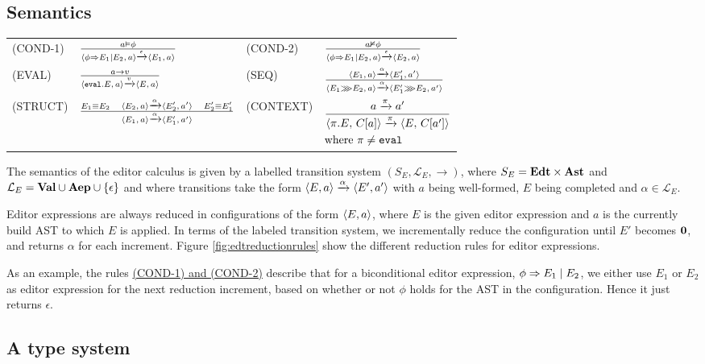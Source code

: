\subsection{Semantics}

\begin{figure*}
  \center
  \renewcommand{\arraystretch}{2}
  \begin{tabular}{llll}
    \scriptsize(COND-1)  & $ \CondOne $           & \scriptsize(COND-2) & $ \CondTwo$ \\
    \scriptsize(EVAL)    & $ \Eval $              & \scriptsize(SEQ)    & $ \Seq$     \\
    \scriptsize(STRUCT)  & $\Struct$              & \scriptsize(CONTEXT)& \scriptsize$\Context$
  \end{tabular}
  \caption{Editor Expression reduction rules}
  \label{fig:edtreductionrules}
\end{figure*}

The semantics of the editor calculus is given by a labelled transition system
$(S_E, \mathcal{L}_E, \to)$, where $S_E = \edt \times \AST$ and $\mathcal{L}_E
= \val \cup \aep \cup \{\epsilon\}$ and where transitions take the form
$\breakpoint{E, a} \transition{$\alpha$} \breakpoint{E', a'}$ with $a$ being
well-formed, $E$ being completed and $\alpha \in \mathcal{L}_E$. 

Editor expressions are always reduced in configurations of the form
$\breakpoint{E,a}$, where $E$ is the given editor expression and $a$ is the
currently build AST to which $E$ is applied. In terms of the labeled
transition system, we incrementally reduce the configuration until $E'$ becomes
$\nil$, and returns $\alpha$ for each increment. Figure
\ref{fig:edtreductionrules} show the different reduction rules for editor
expressions.

As an example, the rules \hyperref[fig:edtreductionrules]{(COND-1) and (COND-2)} describe that
for a biconditional editor expression, $\bicond{\phi}{E_1}{E_2}$, we either use
$E_1$ or $E_2$ as editor expression for the next reduction increment, based on
whether or not $\phi$ holds for the AST in the configuration. Hence it just
returns $\epsilon$.

\subsection{A type system}

